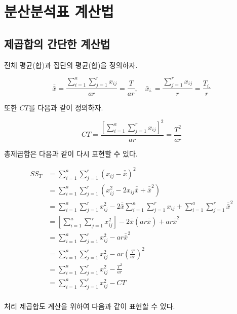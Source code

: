\documentclass[
]{book}
\begin{document}
\hypertarget{onewayhand}{%
\chapter{분산분석표 계산법}\label{onewayhand}}

\hypertarget{uxc81cuxacf1uxd569uxc758-uxac04uxb2e8uxd55c-uxacc4uxc0b0uxbc95}{%
\section{제곱합의 간단한 계산법}\label{uxc81cuxacf1uxd569uxc758-uxac04uxb2e8uxd55c-uxacc4uxc0b0uxbc95}}

전체 평균(합)과 집단의 평균(합)을 정의하자.

\[ \bar{\bar {x}} =  \frac{\sum_{i=1}^a \sum_{j=1}^r x_{ij}}{ar} =\frac{T}{ar}, \quad  \bar {x}_{i.} =   \frac{\sum_{j=1}^r x_{ij}}{r} = \frac{T_{i.}}{r} \]

또한 \(CT\)를 다음과 같이 정의하자.

\[ CT = \frac{ \left [ \sum_{i=1}^a \sum_{j=1}^r x_{ij} \right ]^2 }{ar} = \frac{T^2}{ar} \]

총제곱합은 다음과 같이 다시 표현할 수 있다.

\begin{align*}
SS_T  & = \sum_{i=1}^a \sum_{j=1}^r (x_{ij} - \bar{\bar {x}})^2 \\
  & = \sum_{i=1}^a \sum_{j=1}^r ( x^2_{ij}  -2 x_{ij}  \bar{\bar {x}} + { \bar{\bar {x}}}^2 ) \\
  & = \sum_{i=1}^a \sum_{j=1}^r  x^2_{ij}  -2 \bar{\bar {x}}  \sum_{i=1}^a \sum_{j=1}^r x_{ij}  +  \sum_{i=1}^a \sum_{j=1}^r  { \bar{\bar {x}}}^2 \\
  & =  \left [ \sum_{i=1}^a \sum_{j=1}^r  x^2_{ij} \right ]  -2 \bar{\bar {x}}  (ar \bar{\bar {x}})   + ar  { \bar{\bar {x}}}^2  \\
  & = \sum_{i=1}^a \sum_{j=1}^r  x^2_{ij}  -  ar  { \bar{\bar {x}}}^2   \\
  & = \sum_{i=1}^a \sum_{j=1}^r  x^2_{ij}  -  ar  \left ( \frac{T}{ar}  \right )^2   \\
  & = \sum_{i=1}^a \sum_{j=1}^r  x^2_{ij}  -  \frac{T^2}{ar}     \\
    & = \sum_{i=1}^a \sum_{j=1}^r  x^2_{ij}  -  CT   \\
\end{align*}

처리 제곱합도 계산을 위하여 다음과 같이 표현할 수 있다.
\end{document}
